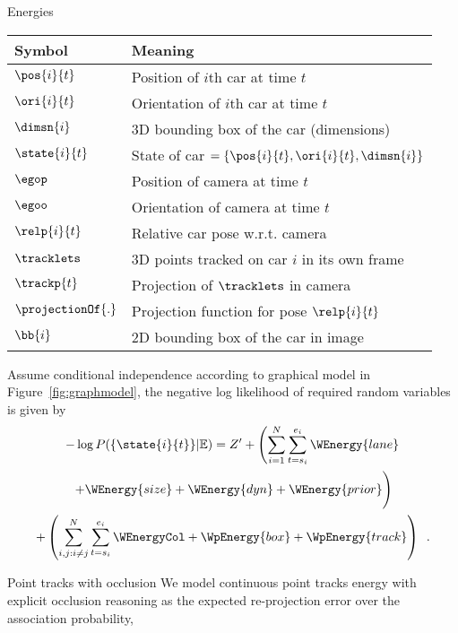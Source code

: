 \documentclass[handout,final]{beamer}
\newlength{\onecolwid}
\begin{document}
\begin{frame}[t]
\begin{columns}[t]
\begin{column}{\onecolwid}
      \begin{block}{Energies}
        \begin{table}[h]
          \begin{tabular}{|l|l|}
            \hline
            Symbol & Meaning \\
            \hline
            $\pos{i}{t}$ & Position of $i$th car at time $t$\\
            $\ori{i}{t}$ & Orientation of $i$th car at time $t$\\
            $\dimsn{i}$ & 3D bounding box of the car (dimensions)\\
            $\state{i}{t}$ & State of car $=\{\pos{i}{t}, \ori{i}{t}, \dimsn{i}\}$\\
            $\egop$ & Position of camera at time $t$\\
            $\egoo$ & Orientation of camera at time $t$\\
            $\relp{i}{t}$ & Relative car pose w.r.t. camera \\
            $\tracklets$ & 3D points tracked on car $i$ in its own frame\\
            $\trackp{t}$ & Projection of $\tracklets$ in camera\\
            $\projectionOf{.}$ & Projection function for pose $\relp{i}{t}$\\
            $\bb{i}$ & 2D bounding box of the car in image\\
            \hline
          \end{tabular}
        \end{table}

        Assume conditional independence according to graphical model in
        Figure~\ref{fig:graphmodel}, the negative log likelihood of required
        random variables is given by
        \begin{multline}
          -\log{P(\{\state{i}{t}\} | \mathbb{E})} = 
          Z' + 
          \left(
            \sum_{i=1}^N \sum_{t=s_i}^{e_i}
            \WEnergy{lane} \right.\\
            \left.
            + \WEnergy{size}
            + \WEnergy{dyn}
            + \WEnergy{prior}
            \vphantom{ \sum_{i=1}^N \sum_{t=s_i}^{e_i} }
          \right)\\
          +
          \left(
            \sum_{i,j:i\ne j}^N \sum_{t=s_i}^{e_i}  \WEnergyCol
            + \WpEnergy{box}
            + \WpEnergy{track}
          \right)
          \enspace.
        \end{multline}
      \end{block}
      \begin{block}{Point tracks with occlusion}
        We model continuous point tracks energy with explicit occlusion reasoning as
        the expected re-projection error over the association probability,


\end{block}
\end{column}
\end{columns}
\end{frame}
\end{document}

